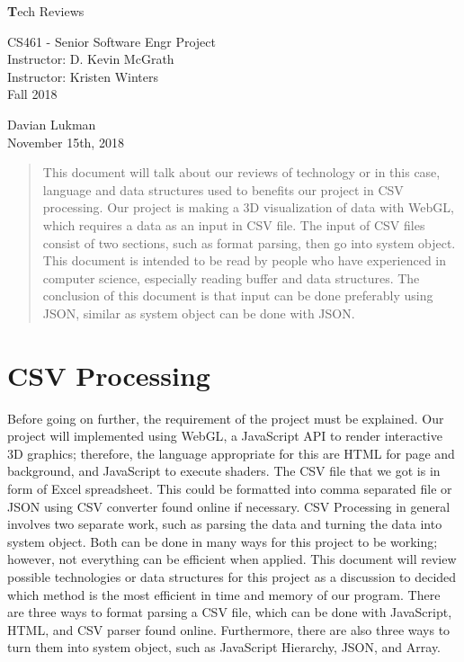 \documentclass[letterpaper,10pt,titlepage, onecolumn, draftclsnofoot]{IEEEtran}
\begin{document}
\begin{center}
  
  \textbf{}

  \vspace{4cm}
  \Huge{}
  \textbf Tech Reviews
  \vspace{1.5cm}

 
  \LARGE
  CS461 - Senior Software Engr Project\\
  \vspace{0.25cm}
  Instructor: D. Kevin McGrath \\
  Instructor: Kristen Winters \\
  \vspace{0.25cm}
  Fall 2018 \\
  \vspace{1.5cm}
  
  \large{Davian Lukman}\\
  \vfill
  November 15th, 2018\\
  \vspace{1cm}
  \vspace*{\fill}
   \begin{abstract}
       \noindent This document will talk about our reviews of technology or in this case, language and data structures used to benefits our project in CSV processing. Our project is making a 3D visualization of data with WebGL, which requires a data as an input in CSV file. The input of CSV files consist of two sections, such as format parsing, then go into system object. This document is intended to be read by people who have experienced in computer science, especially reading buffer and data structures. The conclusion of this document is that input can be done preferably using JSON, similar as system object can be done with JSON.
   \end{abstract}
   \normalsize 
  \end{center}
  
\section{CSV Processing}
Before going on further, the requirement of the project must be explained. Our project will implemented using WebGL\cite{WebGL}, a JavaScript API to render interactive 3D graphics; therefore, the language appropriate for this are HTML for page and background, and JavaScript to execute shaders. The CSV file that we got is in form of Excel spreadsheet. This could be formatted into comma separated file or JSON using CSV converter found online if necessary.\newline
CSV Processing in general involves two separate work, such as parsing the data and turning the data into system object. Both can be done in many ways for this project to be working; however, not everything can be efficient when applied. This document will review possible technologies or data structures for this project as a discussion to decided which method is the most efficient in time and memory of our program. There are three ways to format parsing a CSV file, which can be done with JavaScript, HTML, and CSV parser found online. Furthermore, there are also three ways to turn them into system object, such as JavaScript Hierarchy, JSON, and Array.
\end{document}
